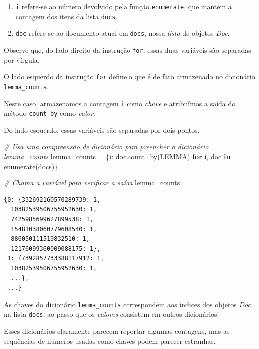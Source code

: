 \documentclass[
  brazilian,
]{article}
\newenvironment{Shaded}{}{}
\newcommand{\BuiltInTok}[1]{#1}
\newcommand{\CommentTok}[1]{\textcolor[rgb]{0.38,0.63,0.69}{\textit{#1}}}
\newcommand{\ControlFlowTok}[1]{\textcolor[rgb]{0.00,0.44,0.13}{\textbf{#1}}}
\newcommand{\KeywordTok}[1]{\textcolor[rgb]{0.00,0.44,0.13}{\textbf{#1}}}
\newcommand{\NormalTok}[1]{#1}
\newcommand{\OperatorTok}[1]{\textcolor[rgb]{0.40,0.40,0.40}{#1}}
\providecommand{\tightlist}{%
  \setlength{\itemsep}{0pt}\setlength{\parskip}{0pt}}
\begin{document}
\begin{enumerate}
\def\labelenumi{\arabic{enumi}.}
\tightlist
\item
  \texttt{i} refere-se ao número devolvido pela função
  \texttt{enumerate}, que mantém a contagem dos itens da lista
  \texttt{docs}.
\item
  \texttt{doc} refere-se ao documento atual em \texttt{docs}, nossa
  \emph{lista} de objetos \emph{Doc}.
\end{enumerate}

Observe que, do lado direito da instrução \texttt{for}, essas duas
variáveis são separadas por vírgula.

O lado esquerdo da instrução \texttt{for} define o que é de fato
armazenado no dicionário \texttt{lemma\_counts}.

Neste caso, armazenamos a contagem \texttt{i} como \emph{chave} e
atribuímos a saída do método \texttt{count\_by} como \emph{valor}.

Do lado esquerdo, essas variáveis são separadas por dois-pontos.

\begin{Shaded}
\begin{Highlighting}[]
\CommentTok{\# Usa uma compreensão de dicionário para preencher o dicionário \textquotesingle{}lemma\_counts\textquotesingle{}}
\NormalTok{lemma\_counts }\OperatorTok{=}\NormalTok{ \{i: doc.count\_by(LEMMA) }\ControlFlowTok{for}\NormalTok{ i, doc }\KeywordTok{in} \BuiltInTok{enumerate}\NormalTok{(docs)\}}

\CommentTok{\# Chama a variável para verificar a saída}
\NormalTok{lemma\_counts}
\end{Highlighting}
\end{Shaded}

\begin{verbatim}
{0: {332692160570289739: 1,
  10382539506755952630: 1,
  7425985699627899538: 1,
  15481038060779608540: 1,
  886050111519832510: 1,
  12176099360009088175: 1},
 1: {7392857733388117912: 1,
  10382539506755952630: 1,
  ...},
 ...}
\end{verbatim}

As chaves do dicionário \texttt{lemma\_counts} correspondem aos índices
dos objetos \emph{Doc} na lista \texttt{docs}, ao passo que os
\emph{valores} consistem em outros dicionários!

Esses dicionários claramente parecem reportar algumas contagens, mas as
sequências de números usadas como chaves podem parecer estranhas.
\end{document}

